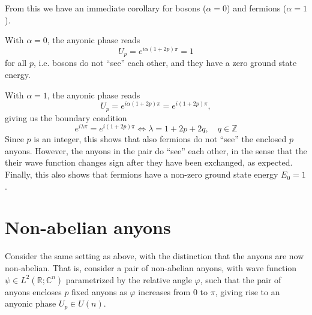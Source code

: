 From this we have an immediate corollary for bosons ($\alpha = 0$) and fermions ($\alpha = 1$).

\begin{corollary}
  With $\alpha = 0$, the anyonic phase reads
  \begin{equation}
    U_p = e^{i\alpha(1+2p)π} = 1
  \end{equation}
  for all $p$, i.e. bosons do not ``see'' each other, and they have a zero ground state energy.

  With $\alpha = 1$, the anyonic phase reads
  \begin{equation}
    U_p = e^{i\alpha(1+2p)π} = e^{i(1+2p)π},
  \end{equation}
  giving us the boundary condition
  \begin{equation}
    e^{iλ π} = e^{i(1+2p)π} \iff λ = 1 + 2p + 2q, \quad q \in \mathbb{Z}
  \end{equation}
  Since $p$ is an integer, this shows that also fermions do not ``see'' the enclosed $p$ anyons.
  However, the anyons in the pair do ``see'' each other, in the sense that the their wave function changes sign after they have been exchanged, as expected. Finally, this also shows that fermions have a non-zero ground state energy $E_0 = 1$.
\end{corollary}












\section{Non-abelian anyons}

Consider the same setting as above, with the distinction that the anyons are now non-abelian. That is, consider a pair of non-abelian anyons, with wave function $\psi \in L^2(\mathbb{R}; \mathbb{C}^n)$ parametrized by the relative angle $\varphi$, such that the pair of anyons encloses $p$ fixed anyons as $\varphi$ increases from $0$ to $π$, giving rise to an anyonic phase $U_p \in U(n)$.





